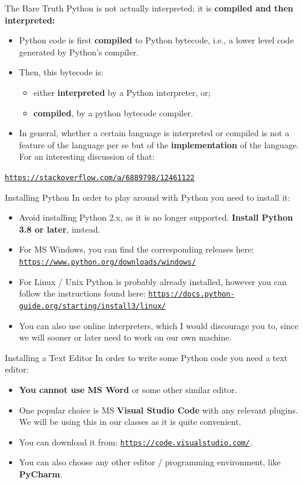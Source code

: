 \documentclass[aspectratio=169, 12pt, xcolor=table]{beamer}
\newcommand{\ohref}[1]{\href{#1}{\texttt{#1}}}
\begin{document}
	\begin{irrelevant}{The Bare Truth}
		Python is not actually interpreted; it is \textbf{compiled and then interpreted:}
		\begin{itemize}
			\item Python code is first \textbf{compiled} to Python bytecode, i.e., a lower level code generated by Python's compiler.
			\item Then, this bytecode is:
			\begin{itemize}
				\item either \textbf{interpreted} by a Python interpreter, or;
				\item \textbf{compiled}, by a python bytecode compiler.
			\end{itemize}
			\item In general, whether a certain language is interpreted or compiled is not a feature of the language per se but of the \textbf{implementation} of the language. For an interesting discussion of that:
		\end{itemize}%
		\begin{center}%
			\vspace{-0.71\topsep}
			\ohref{https://stackoverflow.com/a/6889798/12461122}
		\end{center}
	\end{irrelevant}

	\begin{frame}{Installing Python}
		In order to play around with Python you need to install it:
		\begin{itemize}
			\item Avoid installing Python 2.x, as it is no longer supported. \textbf{Install Python 3.8 or later}, instead.
			\item For MS Windows, you can find the corresponding releases here: \ohref{https://www.python.org/downloads/windows/}
			\item For Linux / Unix Python is probably already installed, however you can follow the instructions found here: \ohref{https://docs.python-guide.org/starting/install3/linux/}
			\item You can also use online interpreters, which I would discourage you to, since we will sooner or later need to work on our own machine.
		\end{itemize}
	\end{frame}

	\begin{frame}{Installing a Text Editor}
		In order to write some Python code you need a text editor:
		\begin{itemize}
			\item \textbf{You cannot use MS Word} or some other similar editor.
			\item One popular choice is MS \textbf{Visual Studio Code} with any relevant plugins. We will be using this in our classes as it is quite convenient.
			\item You can download it from: \ohref{https://code.visualstudio.com/}.
			\item You can also choose any other editor / programming environment, like \textbf{PyCharm}.
		\end{itemize} 
	\end{frame}
\end{document}
